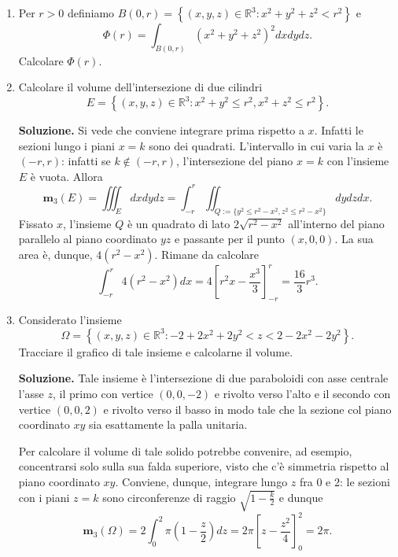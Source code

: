 \begin{enumerate}
	\item Per $r > 0$ definiamo $B(0, r) = \left\{(x, y, z) \in \mathbb{R}^3 : x^2 + y^2 + z^2 < r^2\right\}$ e
	\[
	\Phi(r) = \int_{B(0, r)} (x^2 + y^2 + z^2)^2 dx dy dz.
	\]
	Calcolare $\Phi(r)$.
	
	\item Calcolare il volume dell'intersezione di due cilindri
	\[
	E = \left\{(x,y,z) \in \mathbb{R}^3 : x^2 + y^2 \leq r^2, x^2 + z^2 \leq r^2\right\}.
	\]
	
	\textbf{Soluzione.}
		Si vede che conviene integrare prima rispetto a $x$. Infatti le sezioni lungo i piani $x = k$ sono dei quadrati. L'intervallo in cui varia la $x$ è $(-r, r)$: infatti se $k \notin (-r, r)$, l'intersezione del piano $x = k$ con l'insieme $E$ è vuota. Allora
		\[
		\mathbf{m}_3(E) = \iiint_E dx dy dz = \int_{-r}^r \iint_{Q := \{y^2 \leq r^2 - x^2, z^2 \leq r^2 - x^2\}} dy dz dx.
		\]
		Fissato $x$, l'insieme $Q$ è un quadrato di lato $2 \sqrt{r^2 - x^2}$ all'interno del piano parallelo al piano coordinato $yz$ e passante per il punto $(x, 0, 0)$. La sua area è, dunque, $4(r^2 - x^2)$. Rimane da calcolare
		\[
		\int_{-r}^r 4(r^2 - x^2) dx = 4 \left[r^2 x - \frac{x^3}{3}\right]_{-r}^r = \frac{16}{3} r^3.
		\]
	
	
	\item Considerato l'insieme
	\[
	\Omega = \left\{(x,y,z) \in \mathbb{R}^3 : -2 + 2x^2 + 2y^2 < z < 2 - 2x^2 - 2y^2\right\}.
	\]
	Tracciare il grafico di tale insieme e calcolarne il volume.
	
	\textbf{Soluzione.}
		Tale insieme è l'intersezione di due paraboloidi con asse centrale l'asse $z$, il primo con vertice $(0,0,-2)$ e rivolto verso l'alto e il secondo con vertice $(0,0,2)$ e rivolto verso il basso in modo tale che la sezione col piano coordinato $xy$ sia esattamente la palla unitaria.
		
		Per calcolare il volume di tale solido potrebbe convenire, ad esempio, concentrarsi solo sulla sua falda superiore, visto che c'è simmetria rispetto al piano coordinato $xy$. Conviene, dunque, integrare lungo $z$ fra 0 e 2: le sezioni con i piani $z = k$ sono circonferenze di raggio $\sqrt{1 - \frac{k}{2}}$ e dunque
		\[
		\mathbf{m}_3(\Omega) = 2 \int_0^2 \pi \left(1 - \frac{z}{2}\right) dz = 2\pi \left[z - \frac{z^2}{4}\right]_0^2 = 2\pi.
		\]
		

\end{enumerate}
